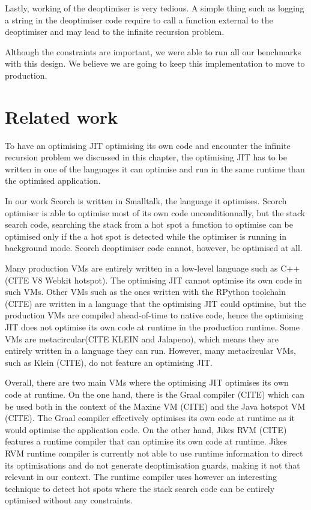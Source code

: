 \documentclass[a4paper,12pt,twoside]{../includes/ThesisStyle}
\begin{document}
Lastly, working of the deoptimiser is very tedious. A simple thing such as logging a string in the deoptimiser code require to call a function external to the deoptimiser and may lead to the infinite recursion problem.

Although the constraints are important, we were able to run all our benchmarks with this design. We believe we are going to keep this implementation to move to production.


\section{Related work}

To have an optimising JIT optimising its own code and encounter the infinite recursion problem we discussed in this chapter, the optimising JIT has to be written in one of the languages it can optimise and run in the same runtime than the optimised application. 

In our work Scorch is written in Smalltalk, the language it optimises. Scorch optimiser is able to optimise most of its own code unconditionnally, but the stack search code, searching the stack from a hot spot a function to optimise can be optimised only if the a hot spot is detected while the optimiser is running in background mode. Scorch deoptimiser code cannot, however, be optimised at all. 

Many production VMs are entirely written in a low-level language such as C++ (CITE V8 Webkit hotspot). The optimising JIT cannot optimise its own code in such VMs. Other VMs such as the ones written with the RPython toolchain (CITE) are written in a language that the optimising JIT could optimise, but the production VMs are compiled ahead-of-time to native code, hence the optimising JIT does not optimise its own code at runtime in the production runtime. Some VMs are metacircular(CITE KLEIN and Jalapeno), which means they are entirely written in a language they can run. However, many metacircular VMs, such as Klein (CITE), do not feature an optimising JIT. 

Overall, there are two main VMs where the optimising JIT optimises its own code at runtime. On the one hand, there is the Graal compiler (CITE) which can be used both in the context of the Maxine VM (CITE) and the Java hotspot VM (CITE). The Graal compiler effectively optimises its own code at runtime as it would optimise the application code. On the other hand, Jikes RVM (CITE) features a runtime compiler that can optimise its own code at runtime. Jikes RVM runtime compiler is currently not able to use runtime information to direct its optimisations and do not generate deoptimisation guards, making it not that relevant in our context. The runtime compiler uses however an interesting technique to detect hot spots where the stack search code can be entirely optimised without any constraints.
\end{document}

